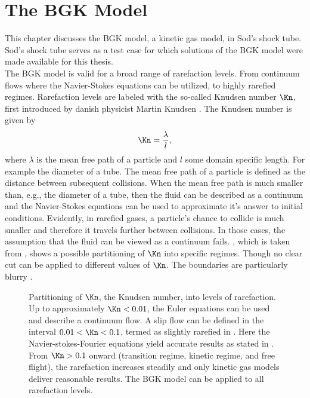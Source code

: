 

\chapter{The BGK Model}
\label{Ch:BGK}

This chapter discusses the BGK model, a kinetic gas model, in Sod's shock tube. Sod's shock tube serves as a test case for which solutions of the BGK model were made available for this thesis.\\
The BGK model is valid for a broad range of rarefaction levels. From continuum flows where the Navier-Stokes equations can be utilized, to highly rarefied regimes. Rarefaction levels are labeled with the so-called Knudsen number \(\Kn\), first introduced by danish physicist Martin Knudsen \cite{Bernard}. The Knudsen number is given by
\begin{equation}
	\Kn = \frac{\lambda}{l}, 
\end{equation}
where \(\lambda\) is the mean free path of a particle and \(l\) some domain specific length. For example the diameter of a tube. The mean free path of a particle is defined as the distance between subsequent collisions. When the mean free path is much smaller than, e.g., the diameter of a tube, then the fluid can be described as a continuum and the Navier-Stokes equations can be used to approximate it's answer to initial conditions. Evidently, in rarefied gases, a particle's chance to collide is much smaller and therefore it travels further between collisions. In those cases, the assumption that the fluid can be viewed as a continuum fails. , which is taken from \cite{NumaKUL}, shows a possible partitioning of \(\Kn\) into specific regimes. Though no clear cut can be applied to different values of \(\Kn\). The boundaries are particularly blurry \cite{schaaf}.
\begin{figure}[H]
	
	\caption{Partitioning of \(\Kn\), the Knudsen number, into levels of rarefaction. Up to approximately \(\Kn < 0.01\), the Euler equations can be used and describe a continuum flow. A slip flow can be defined in the interval \(0.01 < \Kn < 0.1\), termed as slightly rarefied in \cite{schaaf}. Here the Navier-stokes-Fourier equations yield accurate results as stated in \cite{NumaKUL}. From \(\Kn > 0.1\) onward (transition regime, kinetic regime, and free flight), the rarefaction increases steadily and only kinetic gas models deliver reasonable results. The BGK model can be applied to all rarefaction levels.}
	\label{Fig:ExpKN}
\end{figure}
